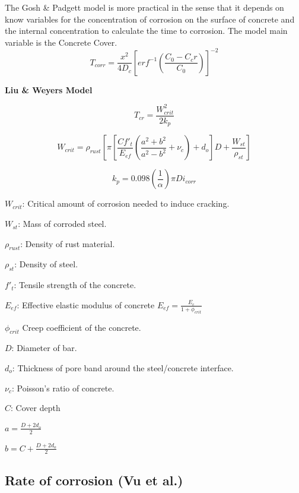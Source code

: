 The Gosh \& Padgett model is more practical in the sense that it depends on know variables for the concentration of corrosion on the surface of concrete and the internal concentration to calculate the time to corrosion. The model main variable is the Concrete Cover.
\begin{equation}
T_{corr}=\frac{x^2}{4 D_c} \left[erf^{-1} \left(\frac{C_0-C_cr}{C_0} \right) \right]^{-2}
  \label{eq.ten}
\end{equation} 

\textbf{Liu \& Weyers Model}

\begin{equation}
  T_{cr}=\frac{W_{crit}^2}{2k_p}
  \label{eq.two}
\end{equation} 

\begin{equation}
  W_{crit}=\rho_{rust} \left[ \pi \left[ \frac{C f'_t}{E_{ef}} \left( \frac{a^2+b^2}{a^2-b^2}+\nu_c \right)+d_o \right] D+ \frac{W_{st}}{\rho_{st}} \right]
  \label{eq.three}
\end{equation} 

\begin{equation}
  k_p=0.098 (\frac{1}{\alpha})\pi Di_{corr}
  \label{eq.four}
\end{equation} 

$W_{crit}$: Critical amount of corrosion needed to induce cracking.

$W_{st}$: Mass of corroded steel.

$\rho_{rust}$: Density of rust material.

$\rho_{st}$: Density of steel.

$f'_t$: Tensile strength of the concrete. 

$E_{ef}$: Effective elastic modulus of concrete $E_{ef}=\frac{E_c}{1+\phi_{crit}}$ 

$\phi_{crit}$ Creep coefficient of the concrete.

$D$: Diameter of bar.

$d_o$: Thickness of pore band around the steel/concrete interface.

$\nu_c$: Poisson's ratio of concrete.

$C$: Cover depth

$a=\frac{D+2d_o}{2}$

$b=C+\frac{D+2d_o}{2}$

\subsection{Rate of corrosion (Vu et al.)}

